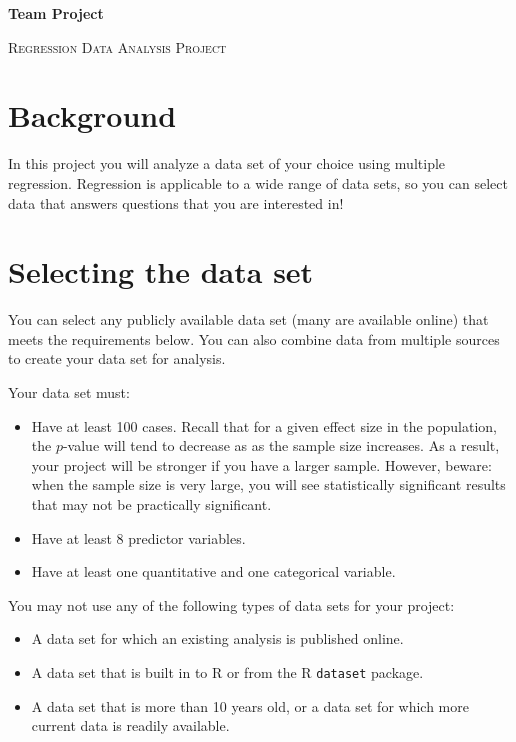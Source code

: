 \documentclass[12pt]{article}
\newcommand{\doctitle}{Team Project}
\begin{document}
\pagestyle{fancy}
\thispagestyle{empty}

\begin{center}
\textbf{\Large\doctitle}

\textsc{\large Regression Data Analysis Project}
\end{center}

\section{Background}
In this project you will analyze a data set of your choice using multiple regression.  Regression is applicable to a wide range of data sets, so you can select data that answers questions that you are interested in!

\section{Selecting the data set}

You can select any publicly available data set (many are available online) that meets the requirements below.  You can also combine data from multiple sources to create your data set for analysis.

Your data set must:
\begin{itemize}
  \item Have at least 100 cases. Recall that for a given effect size in the population, the $p$-value will tend to decrease as as the sample size increases.  As a result, your project will be stronger if you have a larger sample.  However, beware: when the sample size is very large, you will see statistically significant results that may not be practically significant.
    \item Have at least 8 predictor variables.
    \item Have at least one quantitative and one categorical variable.
\end{itemize}

You may not use any of the following types of data sets for your project:
\begin{itemize}
  \item A data set for which an existing analysis is published online.
  \item A data set that is built in to R or from the R \texttt{dataset} package.
  \item A data set that is more than 10 years old, or a data set for which more current data is readily available. 
\end{itemize}
\end{document}
